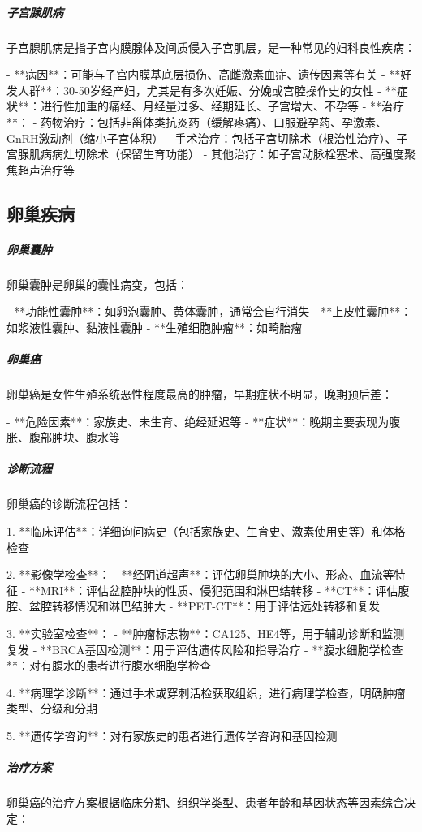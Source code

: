 \begin{enumerate}
\subparagraph{子宫腺肌病}

子宫腺肌病是指子宫内膜腺体及间质侵入子宫肌层，是一种常见的妇科良性疾病：

- **病因**：可能与子宫内膜基底层损伤、高雌激素血症、遗传因素等有关
- **好发人群**：30-50岁经产妇，尤其是有多次妊娠、分娩或宫腔操作史的女性
- **症状**：进行性加重的痛经、月经量过多、经期延长、子宫增大、不孕等
- **治疗**：
  - 药物治疗：包括非甾体类抗炎药（缓解疼痛）、口服避孕药、孕激素、GnRH激动剂（缩小子宫体积）
  - 手术治疗：包括子宫切除术（根治性治疗）、子宫腺肌病病灶切除术（保留生育功能）
  - 其他治疗：如子宫动脉栓塞术、高强度聚焦超声治疗等

\subsection{卵巢疾病}

\subparagraph{卵巢囊肿}

卵巢囊肿是卵巢的囊性病变，包括：

- **功能性囊肿**：如卵泡囊肿、黄体囊肿，通常会自行消失
- **上皮性囊肿**：如浆液性囊肿、黏液性囊肿
- **生殖细胞肿瘤**：如畸胎瘤

\subparagraph{卵巢癌}

卵巢癌是女性生殖系统恶性程度最高的肿瘤，早期症状不明显，晚期预后差：

- **危险因素**：家族史、未生育、绝经延迟等
- **症状**：晚期主要表现为腹胀、腹部肿块、腹水等

\subparagraph{诊断流程}

卵巢癌的诊断流程包括：

1. **临床评估**：详细询问病史（包括家族史、生育史、激素使用史等）和体格检查

2. **影像学检查**：
   - **经阴道超声**：评估卵巢肿块的大小、形态、血流等特征
   - **MRI**：评估盆腔肿块的性质、侵犯范围和淋巴结转移
   - **CT**：评估腹腔、盆腔转移情况和淋巴结肿大
   - **PET-CT**：用于评估远处转移和复发

3. **实验室检查**：
   - **肿瘤标志物**：CA125、HE4等，用于辅助诊断和监测复发
   - **BRCA基因检测**：用于评估遗传风险和指导治疗
   - **腹水细胞学检查**：对有腹水的患者进行腹水细胞学检查

4. **病理学诊断**：通过手术或穿刺活检获取组织，进行病理学检查，明确肿瘤类型、分级和分期

5. **遗传学咨询**：对有家族史的患者进行遗传学咨询和基因检测

\subparagraph{治疗方案}

卵巢癌的治疗方案根据临床分期、组织学类型、患者年龄和基因状态等因素综合决定：


\end{enumerate}
